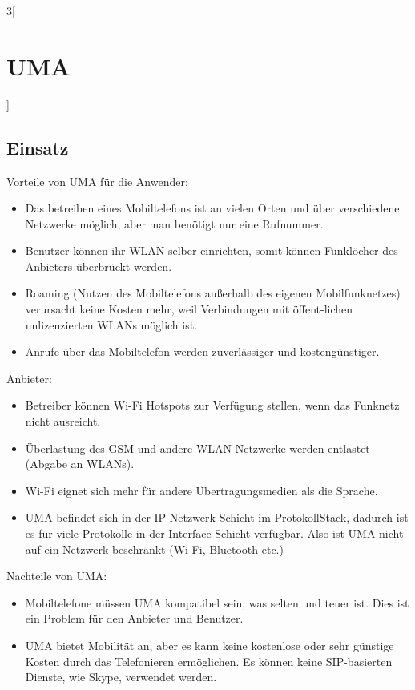 \begin{multicols}{3}[\section{UMA}]
\subsection*{Einsatz}
Vorteile von UMA für die 
Anwender:
\begin{itemize}
	\item Das betreiben eines Mobiltelefons ist an vielen Orten und über verschiedene Netzwerke möglich, aber man benötigt nur eine Rufnummer. 
	\item Benutzer können ihr WLAN selber einrichten, somit können Funklöcher des Anbieters überbrückt werden.
	\item Roaming (Nutzen des Mobiltelefons außerhalb des eigenen Mobilfunknetzes) verursacht keine Kosten mehr, weil Verbindungen mit öffent-lichen unlizenzierten WLANs möglich ist.
   	\item Anrufe über das Mobiltelefon werden zuverlässiger und kostengünstiger.~\cite{uma.2}
\end{itemize}
Anbieter: 
\begin{itemize}
	\item Betreiber können Wi-Fi Hotspots zur Verfügung stellen, wenn das Funknetz nicht ausreicht. 
	\item Überlastung des GSM und andere WLAN Netzwerke werden entlastet (Abgabe an WLANs).
	\item Wi-Fi eignet sich mehr für andere Übertragungsmedien als die Sprache.
	\item UMA befindet sich in der IP Netzwerk Schicht im ProtokollStack, dadurch ist es für viele Protokolle in der Interface Schicht verfügbar. Also ist UMA nicht auf ein Netzwerk beschränkt (Wi-Fi, Bluetooth etc.)~\cite{uma.2}
\end{itemize}
Nachteile von UMA:
\begin{itemize}
	\item Mobiltelefone müssen UMA kompatibel sein, was selten und teuer ist. Dies ist ein Problem für den Anbieter und Benutzer.
	\item UMA bietet Mobilität an, aber es kann keine kostenlose oder sehr günstige Kosten durch das Telefonieren ermöglichen. Es können keine SIP-basierten Dienste, wie Skype, verwendet werden.~\cite{uma.2}
\end{itemize}


\end{multicols}
